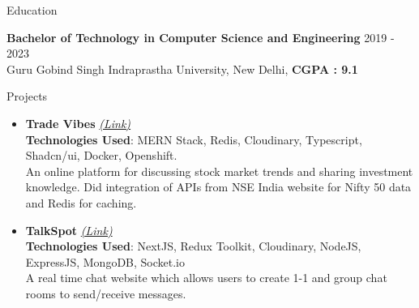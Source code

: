 \documentclass{resume} %
\begin{document}

\begin{rSection}{Education}

{\bf Bachelor of Technology in Computer Science and Engineering} \hfill {2019 - 2023}
\\ 
{\normalfont Guru Gobind Singh Indraprastha University, New Delhi}, \textbf{CGPA : 9.1}

\end{rSection}
 


\begin{rSection}{Projects}
   \begin{itemize}
    \item \textbf{Trade Vibes} 
    \href{https://github.com/tushargahlaut/TradeVibes}
    {\emph{(Link)}}
    \\ \textbf{Technologies Used}: MERN Stack, Redis, Cloudinary, Typescript, Shadcn/ui, Docker, Openshift.
     \\An online platform for discussing stock market trends and sharing investment knowledge. Did integration of APIs from NSE India website for Nifty 50 data and Redis for caching.
    \item \textbf{TalkSpot} 
   \href{https://github.com/tushargahlaut/talkspot-chat-app}{\emph{(Link)}} 
   \\ \textbf{Technologies Used}: NextJS, Redux Toolkit, Cloudinary, NodeJS, ExpressJS, MongoDB, Socket.io 
   \\{\normalfont A real time chat website which allows users to create 1-1 and group chat rooms to send/receive messages.}
   
   \end{itemize}
\end{rSection}
\end{document}
